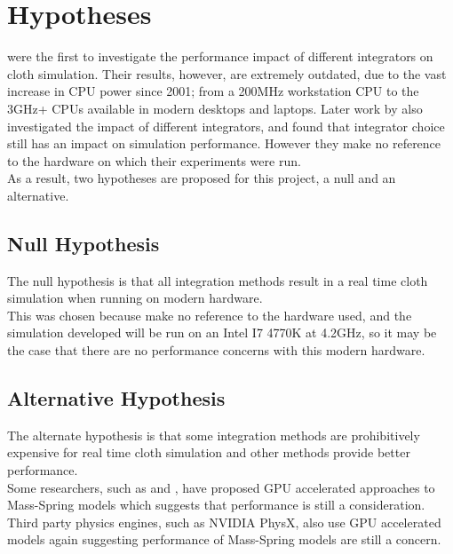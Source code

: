 \section{Hypotheses}
\textcite{Volino2001} were the first to investigate the performance impact of different integrators on cloth simulation. Their results, however, are extremely outdated, due to the vast increase in CPU power since 2001; from a 200MHz workstation CPU to the 3GHz+ CPUs available in modern desktops and laptops. Later work by \textcite{Wang2009a} also investigated the impact of different integrators, and found that integrator choice still has an impact on simulation performance. However they make no reference to the hardware on which their experiments were run.
\\As a result, two hypotheses are proposed for this project, a null and an alternative.

\subsection{Null Hypothesis}
The null hypothesis is that all integration methods result in a real time cloth simulation when running on modern hardware.
\\This was chosen because \textcite{Wang2009a} make no reference to the hardware used, and the simulation developed will be run on an Intel I7 4770K at 4.2GHz, so it may be the case that there are no performance concerns with this modern hardware.

\subsection{Alternative Hypothesis}
The alternate hypothesis is that some integration methods are prohibitively expensive for real time cloth simulation and other methods provide better performance.
\\Some researchers, such as \textcite{Zeller2005} and \textcite{Tang2013}, have proposed GPU accelerated approaches to Mass-Spring models which suggests that performance is still a consideration. Third party physics engines, such as NVIDIA\textsuperscript{\textregistered} PhysX\textsuperscript{\textregistered}, also use GPU accelerated models \parencite{Kim2011} again suggesting performance of Mass-Spring models are still a concern.

